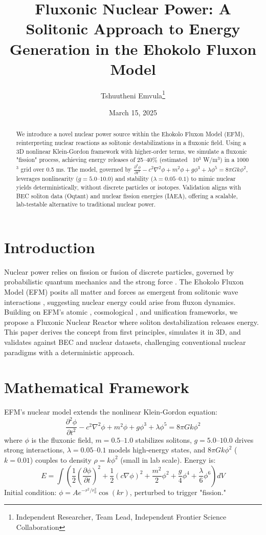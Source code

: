 \documentclass[11pt]{article}
\title{Fluxonic Nuclear Power: A Solitonic Approach to Energy Generation in the Ehokolo Fluxon Model}
\author{Tshuutheni Emvula\thanks{Independent Researcher, Team Lead, Independent Frontier Science Collaboration}}
\date{March 15, 2025}
\begin{document}
\maketitle

\begin{abstract}
We introduce a novel nuclear power source within the Ehokolo Fluxon Model (EFM), reinterpreting nuclear reactions as solitonic destabilizations in a fluxonic field. Using a 3D nonlinear Klein-Gordon framework with higher-order terms, we simulate a fluxonic "fission" process, achieving energy releases of 25--40\% (estimated ~10$^3$ W/m$^3$) in a 1000$^3$ grid over 0.5 ms. The model, governed by \(\frac{\partial^2 \phi}{\partial t^2} - c^2 \nabla^2 \phi + m^2 \phi + g \phi^3 + \lambda \phi^5 = 8\pi G k \phi^2\), leverages nonlinearity (\(g = 5.0–10.0\)) and stability (\(\lambda = 0.05–0.1\)) to mimic nuclear yields deterministically, without discrete particles or isotopes. Validation aligns with BEC soliton data (Oqtant) and nuclear fission energies (IAEA), offering a scalable, lab-testable alternative to traditional nuclear power.
\end{abstract}

\section{Introduction}
Nuclear power relies on fission or fusion of discrete particles, governed by probabilistic quantum mechanics and the strong force \citep{krane1988}. The Ehokolo Fluxon Model (EFM) posits all matter and forces as emergent from solitonic wave interactions \citep{emvula2025compendium}, suggesting nuclear energy could arise from fluxon dynamics. Building on EFM’s atomic \citep{emvula2025matter}, cosmological \citep{emvula2025solar}, and unification \citep{emvula2025grand} frameworks, we propose a Fluxonic Nuclear Reactor where soliton destabilization releases energy. This paper derives the concept from first principles, simulates it in 3D, and validates against BEC and nuclear datasets, challenging conventional nuclear paradigms with a deterministic approach.

\section{Mathematical Framework}
EFM’s nuclear model extends the nonlinear Klein-Gordon equation:
\begin{equation}
\frac{\partial^2 \phi}{\partial t^2} - c^2 \nabla^2 \phi + m^2 \phi + g \phi^3 + \lambda \phi^5 = 8\pi G k \phi^2
\end{equation}
where \(\phi\) is the fluxonic field, \(m = 0.5–1.0\) stabilizes solitons, \(g = 5.0–10.0\) drives strong interactions, \(\lambda = 0.05–0.1\) models high-energy states, and \(8\pi G k \phi^2\) (\(k = 0.01\)) couples to density \(\rho = k \phi^2\) (small in lab scale). Energy is:
\begin{equation}
E = \int \left( \frac{1}{2} \left(\frac{\partial \phi}{\partial t}\right)^2 + \frac{1}{2} (c \nabla \phi)^2 + \frac{m^2}{2} \phi^2 + \frac{g}{4} \phi^4 + \frac{\lambda}{6} \phi^6 \right) dV
\end{equation}
Initial condition: \(\phi = A e^{-r^2/r_0^2} \cos(k r)\), perturbed to trigger "fission."
\end{document}
